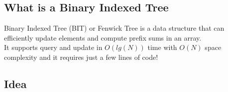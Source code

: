\subsection{What is a Binary Indexed Tree}

Binary Indexed Tree (BIT) or Fenwick Tree is a data structure that can efficiently update
elements and compute prefix sums in an array.\\

It supports query and update in $O(lg(N))$ time with $O(N)$ space complexity and it requires just a few lines of code!

\subsection{Idea}


